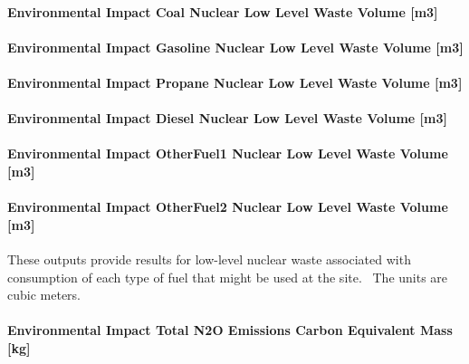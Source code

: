 \paragraph{Environmental Impact Coal Nuclear Low Level Waste Volume {[}m3{]}}\label{environmental-impact-coal-nuclear-low-level-waste-volume-m3}

\paragraph{Environmental Impact Gasoline Nuclear Low Level Waste Volume {[}m3{]}}\label{environmental-impact-gasoline-nuclear-low-level-waste-volume-m3}

\paragraph{Environmental Impact Propane Nuclear Low Level Waste Volume {[}m3{]}}\label{environmental-impact-propane-nuclear-low-level-waste-volume-m3}

\paragraph{Environmental Impact Diesel Nuclear Low Level Waste Volume {[}m3{]}}\label{environmental-impact-diesel-nuclear-low-level-waste-volume-m3}

\paragraph{Environmental Impact OtherFuel1 Nuclear Low Level Waste Volume {[}m3{]}}\label{environmental-impact-otherfuel1-nuclear-low-level-waste-volume-m3}

\paragraph{Environmental Impact OtherFuel2 Nuclear Low Level Waste Volume {[}m3{]}}\label{environmental-impact-otherfuel2-nuclear-low-level-waste-volume-m3}

These outputs provide results for low-level nuclear waste associated with consumption of each type of fuel that might be used at the site.~ The units are cubic meters.

\paragraph{Environmental Impact Total N2O Emissions Carbon Equivalent Mass {[}kg{]}}\label{environmental-impact-total-n2o-emissions-carbon-equivalent-mass-kg}


